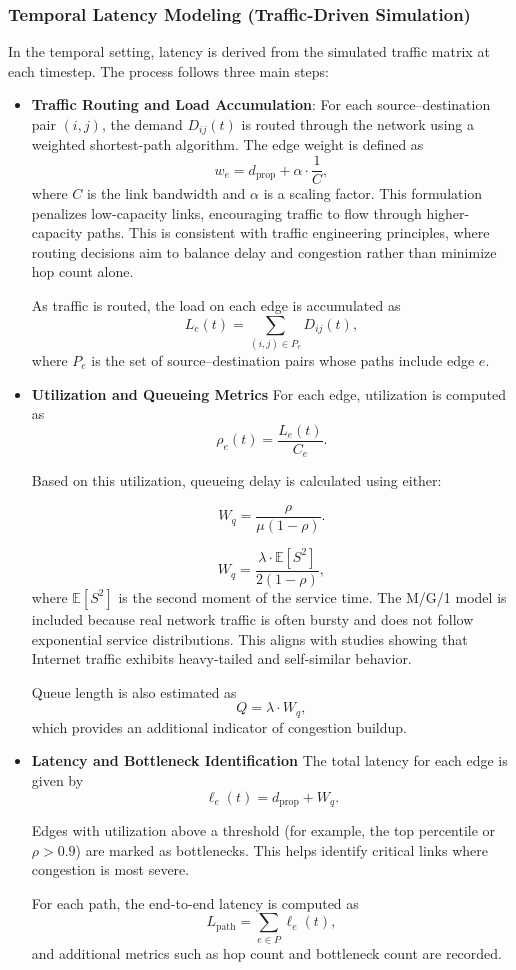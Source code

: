 \documentclass[12pt]{article}
\begin{document}
\subsubsection{Temporal Latency Modeling (Traffic-Driven Simulation)}
In the temporal setting, latency is derived from the simulated traffic matrix at each timestep. The process follows three main steps:
\begin{itemize}
    \item \textbf{Traffic Routing and Load Accumulation}: 
    For each source--destination pair $(i,j)$, the demand $D_{ij}(t)$ is routed through the network using a weighted shortest-path algorithm. The edge weight is defined as
    \[
    w_e = d_{\mathrm{prop}} + \alpha \cdot \frac{1}{C},
    \]
    where $C$ is the link bandwidth and $\alpha$ is a scaling factor. This formulation penalizes low-capacity links, encouraging traffic to flow through higher-capacity paths. This is consistent with traffic engineering principles, where routing decisions aim to balance delay and congestion rather than minimize hop count alone.
    
    As traffic is routed, the load on each edge is accumulated as
    \[
    L_e(t) = \sum_{(i,j)\in P_e} D_{ij}(t),
    \]
    where $P_e$ is the set of source--destination pairs whose paths include edge $e$.

    \item \textbf{Utilization and Queueing Metrics}
    For each edge, utilization is computed as
    \[
    \rho_e(t) = \frac{L_e(t)}{C_e}.
    \]
    
    Based on this utilization, queueing delay is calculated using either:
    
    \[
    W_q = \frac{\rho}{\mu (1 - \rho)}.
    \]

    \[
    W_q = \frac{\lambda \cdot \mathbb{E}[S^2]}{2(1 - \rho)},
    \]
    where $\mathbb{E}[S^2]$ is the second moment of the service time. The M/G/1 model is included because real network traffic is often bursty and does not follow exponential service distributions. This aligns with studies showing that Internet traffic exhibits heavy-tailed and self-similar behavior.
    
    Queue length is also estimated as
    \[
    Q = \lambda \cdot W_q,
    \]
    which provides an additional indicator of congestion buildup.

    \item \textbf{Latency and Bottleneck Identification}
    The total latency for each edge is given by
    \[
    \ell_e(t) = d_{\mathrm{prop}} + W_q.
    \]
    
    Edges with utilization above a threshold (for example, the top percentile or $\rho > 0.9$) are marked as bottlenecks. This helps identify critical links where congestion is most severe.
    
    For each path, the end-to-end latency is computed as
    \[
    L_{\mathrm{path}} = \sum_{e \in P} \ell_e(t),
    \]
    and additional metrics such as hop count and bottleneck count are recorded.
        
\end{itemize}
\end{document}
